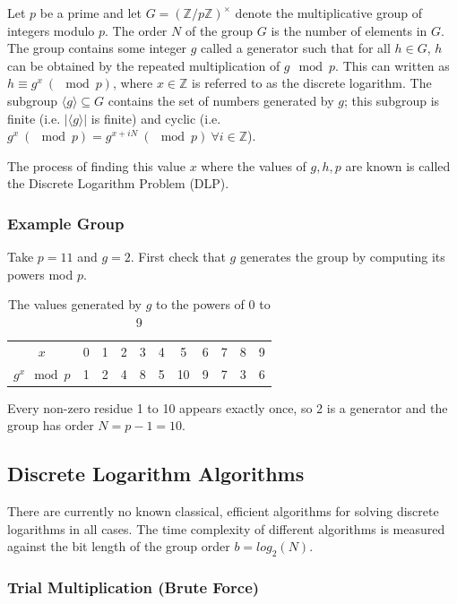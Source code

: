 \documentclass{article}
\begin{document}
Let $p$ be a prime and let $G = (\mathbb{Z}/p\mathbb{Z})^\times$ denote the multiplicative group of integers modulo $p$. The order $N$ of the group $G$ is the number of elements in $G$. The group contains some integer $g$ called a generator such that for all $h \in G$, $h$ can be obtained by the repeated multiplication of $g \mod p$. This can written as $h \equiv g^x \ (\mod  p)$, where $x \in \mathbb{Z}$ is referred to as the discrete logarithm. The subgroup $\langle g \rangle \subseteq G$ contains the set of numbers generated by $g$; this subgroup is finite (i.e. $| \langle g \rangle |$ is finite) and cyclic (i.e. $g^x \ (\mod p) = g^{x + iN} \ (\mod p) \ \forall i \in \mathbb{Z}$).

The process of finding this value $x$ where the values of $g, h, p$ are known is called the Discrete Logarithm Problem (DLP).

\subsubsection{Example Group}
Take $p = 11$ and $g = 2$. First check that $g$ generates the group by computing its powers mod $p$.

\begin{table}[H]
    \centering
    \begin{tabular}{c|c|c|c|c|c|c|c|c|c|c}
        $x$ & 0 & 1 & 2 & 3 & 4 & 5 & 6 & 7 & 8 & 9 \\
        $g^x \mod p$ & 1 & 2 & 4 & 8 & 5 & 10 & 9 & 7 & 3 & 6
    \end{tabular}
    \caption{The values generated by $g$ to the powers of 0 to 9}
    \label{tab:group-example}
\end{table}

Every non-zero residue 1 to 10 appears exactly once, so 2 is a generator and the group has order $N = p - 1 = 10$.

\subsection{Discrete Logarithm Algorithms} \label{sec:discrete-log-algorithms}

There are currently no known classical, efficient algorithms for solving discrete logarithms in all cases. The time complexity of different algorithms is measured against the bit length of the group order $b = log_2(N)$.

\subsubsection{Trial Multiplication (Brute Force)}
\end{document}
